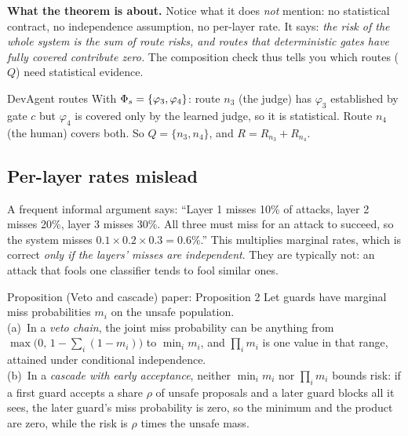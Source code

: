 \textbf{What the theorem is about.} Notice what it does \emph{not} mention: no statistical contract, no independence assumption, no per-layer rate. It says: \emph{the risk of the whole system is the sum of route risks, and routes that deterministic gates have fully covered contribute zero.} The composition check thus tells you which routes ($Q$) need statistical evidence.

\begin{example}{DevAgent routes}
With $\Phi_s=\{\varphi_3,\varphi_4\}$: route $n_3$ (the judge) has $\varphi_3$ established by gate $c$ but $\varphi_4$ is covered only by the learned judge, so it is statistical. Route $n_4$ (the human) covers both. So $Q=\{n_3,n_4\}$, and $R=R_{n_3}+R_{n_4}$.
\end{example}

\subsection{Per-layer rates mislead}

A frequent informal argument says: ``Layer 1 misses 10\% of attacks, layer 2 misses 20\%, layer 3 misses 30\%. All three must miss for an attack to succeed, so the system misses $0.1\times0.2\times0.3=0.6\%$.'' This multiplies marginal rates, which is correct \emph{only if the layers' misses are independent}. They are typically not: an attack that fools one classifier tends to fool similar ones.

\begin{statement}{Proposition (Veto and cascade) \hfill\normalfont paper: Proposition 2}
Let guards have marginal miss probabilities $m_i$ on the unsafe population.\\
(a)~In a \emph{veto chain}, the joint miss probability can be anything from $\max\bigl(0,\,1-\sum_i(1-m_i)\bigr)$ to $\min_im_i$, and $\prod_im_i$ is one value in that range, attained under conditional independence.\\
(b)~In a \emph{cascade with early acceptance}, neither $\min_im_i$ nor $\prod_im_i$ bounds risk: if a first guard accepts a share $\rho$ of unsafe proposals and a later guard blocks all it sees, the later guard's miss probability is zero, so the minimum and the product are zero, while the risk is $\rho$ times the unsafe mass.
\end{statement}

